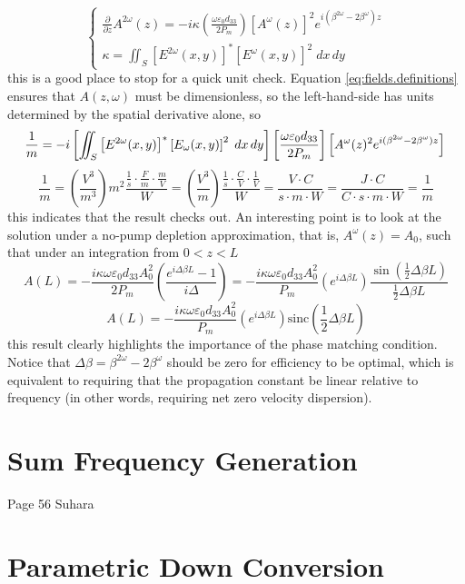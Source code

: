 \begin{equation}
    \begin{cases}
        \frac{\partial}{\partial z} A^{2\omega}(z)=-i\kappa\left(\frac{\omega\varepsilon_0d_{33}}{2P_m}\right)\left[A^{\omega}(z)\right]^2e^{i(\beta^{2\omega}-2\beta^{\omega}) z}\\
        \kappa=\iint_S\left[E^{2\omega}(x,y)\right]^*\left[E^\omega(x,y)\right]^2\;dx\,dy
    \end{cases}
\end{equation}
this is a good place to stop for a quick unit check. Equation \ref{eq:fields.definitions} ensures that $A(z,\omega)$ must be dimensionless, so the left-hand-side has units determined by the spatial derivative alone, so
\begin{equation*}
    \frac{1}{m}=-i\left[\iint_S\left[E^{2\omega}(x,y)\right]^*\left[E_\omega(x,y)\right]^2\;dx\,dy\right]\left[\frac{\omega\varepsilon_0d_{33}}{2P_m}\right]\left[A^{\omega}(z)^2e^{i(\beta^{2\omega}-2\beta^{\omega}) z}\right]\\
\end{equation*}
\begin{equation*}
    \frac{1}{m}=\left(\frac{V^3}{m^3}\right)m^2\frac{\frac{1}{s}\cdot\frac{F}{m}\cdot\frac{m}{V}}{W}=
    \left(\frac{V^3}{m}\right)\frac{\frac{1}{s}\cdot \frac{C}{V}\cdot\frac{1}{V}}{W}=\frac{V\cdot C}{s\cdot m \cdot W}=\frac{J\cdot C}{C\cdot s\cdot m\cdot W}=\frac{1}{m}
\end{equation*}
this indicates that the result checks out. An interesting point is to look at the solution under a no-pump depletion approximation, that is, $A^\omega(z)=A_0$, such that under an integration from $0<z<L$
\begin{equation}
    A(L)=-\frac{i\kappa\omega\varepsilon_0d_{33}A_0^2}{2P_m}\left(\frac{e^{i\Delta\beta L}-1}{i\Delta}\right)=-\frac{i\kappa\omega\varepsilon_0d_{33}A_0^2}{P_m}\left(e^{i\Delta\beta L}\right)\frac{\sin{\left(\frac{1}{2}\Delta\beta L\right)}}{\frac{1}{2}\Delta\beta L}
\end{equation}
\begin{equation}
    A(L)=-\frac{i\kappa\omega\varepsilon_0d_{33}A_0^2}{P_m}\left(e^{i\Delta\beta L}\right)\text{sinc}{\left(\frac{1}{2}\Delta\beta L\right)}
\end{equation}
this result clearly highlights the importance of the phase matching condition. Notice that $\Delta\beta=\beta^{2\omega}-2\beta^{\omega}$ should be zero for efficiency to be optimal, which is equivalent to requiring that the propagation constant be linear relative to frequency (in other words, requiring net zero velocity dispersion).

\section{Sum Frequency Generation}

Page 56 Suhara

\section{Parametric Down Conversion}
